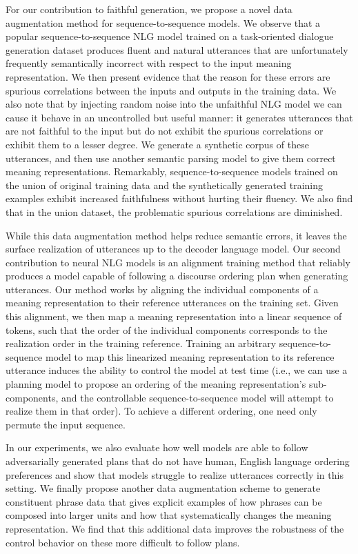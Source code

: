 For our contribution to faithful generation, we propose a novel data
augmentation method for sequence-to-sequence models.  We observe that a
popular sequence-to-sequence NLG model trained on a task-oriented dialogue
generation dataset produces fluent and natural utterances that are
unfortunately frequently semantically incorrect with respect to the input
meaning representation.  We then present evidence that the reason for these
errors are spurious correlations between the inputs and outputs in the
training data.  We also note that by injecting random noise into the
unfaithful NLG model we can cause it behave in an uncontrolled but useful
manner: it generates utterances that are not faithful to the input but do not
exhibit the spurious correlations or exhibit them to a lesser degree.  We
generate a synthetic corpus of these utterances, and then use another semantic
parsing model to give them correct meaning representations.  Remarkably,
sequence-to-sequence models trained on the union of original training data and
the synthetically generated training examples exhibit increased faithfulness
without hurting their fluency. We also find that in the union dataset, the
problematic spurious correlations are diminished.

While this data augmentation method helps reduce semantic errors, it leaves
the surface realization of utterances up to the decoder language model.  Our
second contribution to neural NLG models is an alignment training method that
reliably produces a model capable of following a discourse ordering plan when
generating utterances. 
Our method works by
aligning the individual components of a meaning representation to their
reference utterances on the training set. Given this alignment, we then map a
meaning representation into a linear sequence of tokens, such that the order
of the individual components corresponds to the realization order in the
training reference. Training an arbitrary sequence-to-sequence model to map
this linearized meaning representation to its reference utterance induces the
ability to control the model at test time (i.e., we can use a planning model
to propose an ordering of the meaning representation's sub-components, and the
controllable sequence-to-sequence model will attempt to realize them in that
order).  To achieve a different ordering, one need only permute the input
sequence.

In our experiments, we also evaluate how well models are able to follow
adversarially generated plans that do not have human, English language
ordering preferences and show that models struggle to realize utterances
correctly in this setting. We finally propose another data augmentation scheme
to generate constituent phrase data that gives explicit examples of how
phrases can be composed into larger units and how that systematically changes
the meaning representation. We find that this additional data improves the
robustness of the control behavior on these more difficult to follow plans.
